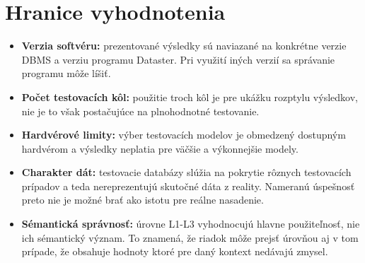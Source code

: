 \section{Hranice vyhodnotenia}
\label{sub:k7_hranice_vyhodnotenia}
\begin{itemize}
    \item \textbf{Verzia softvéru:} prezentované výsledky sú naviazané na konkrétne verzie DBMS a verziu programu Dataster. Pri využití iných verzií sa správanie programu môže líšiť. 
    \item \textbf{Počet testovacích kôl:} použitie troch kôl je pre ukážku rozptylu výsledkov, nie je to však postačujúce na plnohodnotné testovanie.
    \item \textbf{Hardvérové limity:} výber testovacích modelov je obmedzený dostupným hardvérom a výsledky neplatia pre väčšie a výkonnejšie modely.
    \item \textbf{Charakter dát:} testovacie databázy slúžia na pokrytie rôznych testovacích prípadov a teda nereprezentujú skutočné dáta z reality. Nameranú úspešnosť preto nie je možné brať ako istotu pre reálne nasadenie.
    \item \textbf{Sémantická správnosť:} úrovne L1-L3 vyhodnocujú hlavne použiteľnosť, nie ich sémantický význam. To znamená, že riadok môže prejsť úrovňou aj v tom prípade, že obsahuje hodnoty ktoré pre daný kontext nedávajú zmysel.
\end{itemize}

